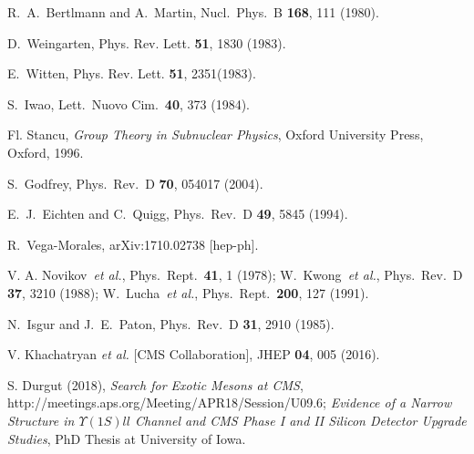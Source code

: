 \documentclass[twocolumn,showpacs,superscriptaddress,preprintnumbers,nofootinbib,prd]{revtex4-1}
\begin{document}
\begin{thebibliography}{}
  R.~A.~Bertlmann and A.~Martin,
  Nucl.\ Phys.\ B {\bf 168}, 111 (1980).

 D.~Weingarten, %
 Phys. Rev. Lett. {\bfseries 51}, 1830 (1983).

 E.~Witten, %
 Phys. Rev. Lett. {\bfseries 51}, 2351(1983).

  S.~Iwao,
  Lett.\ Nuovo Cim.\  {\bf 40}, 373 (1984).

  Fl. Stancu,
  {\it Group Theory in Subnuclear Physics},
  Oxford University Press, Oxford, 1996.

  S.~Godfrey,
  Phys.\ Rev.\ D {\bf 70}, 054017 (2004).

  E.~J.~Eichten and C.~Quigg,
  Phys.\ Rev.\ D {\bf 49}, 5845 (1994).

  R.~Vega-Morales,
  arXiv:1710.02738 [hep-ph].

  V. A. Novikov~\textit{et al.},
  Phys.\ Rept.\  {\bf 41}, 1 (1978);
  W.~Kwong~\textit{et al.},
  Phys.\ Rev.\ D {\bf 37}, 3210 (1988);
  W.~Lucha~\textit{et al.},
  Phys.\ Rept.\  {\bf 200}, 127 (1991).

  N.~Isgur and J.~E.~Paton,
  Phys.\ Rev.\ D {\bf 31}, 2910 (1985).

  V. Khachatryan \textit{et al.} [CMS Collaboration],
  JHEP {\bf 04}, 005 (2016).

 S. Durgut (2018), \textit{Search for Exotic Mesons at CMS},
 http://meetings.aps.org/Meeting/APR18/Session/U09.6;
 \textit{Evidence of a Narrow Structure in $\Upsilon(1S)ll$ Channel
 and CMS Phase I and II Silicon Detector Upgrade Studies},
 PhD Thesis at University of Iowa.
  		
\end{thebibliography}
\end{document}
